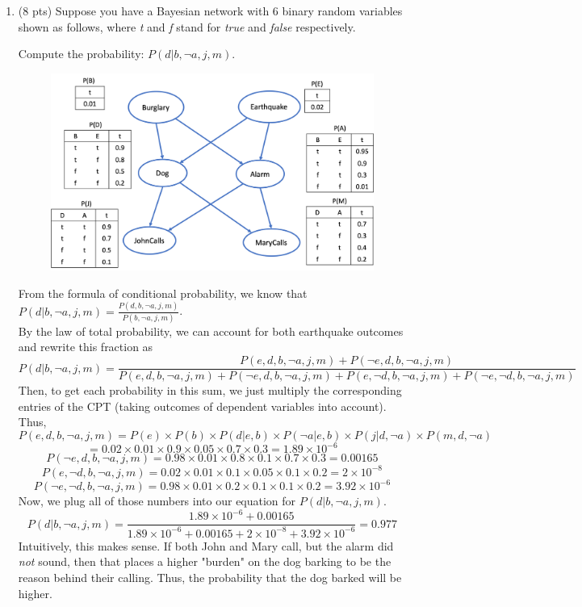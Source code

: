 \documentclass{article}
\newenvironment{soln}{
	\leavevmode\color{blue}\ignorespaces
}{}
\begin{document}
\begin{enumerate}
\item (8 pts) Suppose you have a Bayesian network with 6 binary random variables shown as follows, where \emph{t} and \emph{f} stand for \emph{true} and \emph{false} respectively.

Compute the probability: $P(d | b, \neg a, j, m)$.

\begin{figure}[h]
\centering
\includegraphics[scale=0.5]{p1}
\label{fig:q1}
\end{figure}

\begin{soln}
From the formula of conditional probability, we know that $P(d | b, \neg a, j, m) = \frac{P(d, b, \neg a, j, m)}{P(b, \neg a, j, m)}$. \\ By the law of total probability, we can account for both earthquake outcomes and rewrite this fraction as  
\[ P(d | b, \neg a, j, m) = \frac{P(e,d, b, \neg a, j, m) + P(\neg e, d, b, \neg a, j, m)}{P(e, d, b, \neg a, j, m) + P(\neg e, d, b, \neg a, j, m) + P(e, \neg d, b, \neg a, j, m) + P(\neg e, \neg d, b, \neg a, j, m)} \]
Then, to get each probability in this sum, we just multiply the corresponding entries of the CPT (taking outcomes of dependent variables into account). Thus,
\[ P(e,d, b, \neg a, j, m) = P(e) \times P(b) \times P(d | e, b) \times P(\neg a | e, b) \times P(j | d, \neg a) \times P(m, d, \neg a) \]
\[ = 0.02 \times 0.01 \times 0.9 \times 0.05 \times 0.7 \times 0.3 = 1.89\times10^{-6}\] 
\[P(\neg e, d, b, \neg a, j, m) = 0.98 \times 0.01 \times 0.8 \times 0.1 \times 0.7 \times 0.3 = 0.00165\]
\[P(e, \neg d, b, \neg a, j, m) = 0.02 \times 0.01 \times 0.1 \times 0.05 \times 0.1 \times 0.2 = 2\times 10^{-8}\]
\[P(\neg e, \neg d, b, \neg a, j, m) = 0.98 \times 0.01 \times 0.2 \times 0.1 \times 0.1 \times 0.2 = 3.92\times 10^{-6}\]
Now, we plug all of those numbers into our equation for $P(d | b, \neg a, j, m)$.
\[P(d | b, \neg a, j, m) = \frac{1.89\times10^{-6} + 0.00165}{1.89\times10^{-6} + 0.00165 + 2\times 10^{-8} +  3.92\times 10^{-6}} = 0.977\]
Intuitively, this makes sense. If both John and Mary call, but the alarm did \textit{not} sound, then that places a higher "burden" on the dog barking to be the reason behind their calling. Thus, the probability that the dog barked will be higher.
\end{soln}


\end{enumerate}
\end{document}
